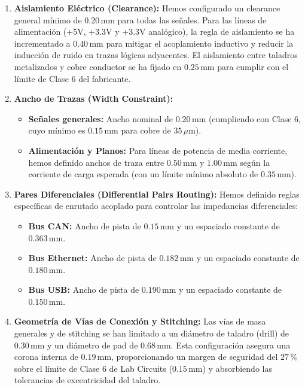 \documentclass[12pt,a4paper]{article}
\begin{document}
\begin{enumerate}
    \item \textbf{Aislamiento Eléctrico (Clearance):} Hemos configurado un clearance general mínimo de $0.20\,\text{mm}$ para todas las señales. Para las líneas de alimentación (+5V, +3.3V y +3.3V analógico), la regla de aislamiento se ha incrementado a $0.40\,\text{mm}$ para mitigar el acoplamiento inductivo y reducir la inducción de ruido en trazas lógicas adyacentes. El aislamiento entre taladros metalizados y cobre conductor se ha fijado en $0.25\,\text{mm}$ para cumplir con el límite de Clase 6 del fabricante.
    \item \textbf{Ancho de Trazas (Width Constraint):}
    \begin{itemize}
        \item \textbf{Señales generales:} Ancho nominal de $0.20\,\text{mm}$ (cumpliendo con Clase 6, cuyo mínimo es $0.15\,\text{mm}$ para cobre de $35\,\mu\text{m}$).
        \item \textbf{Alimentación y Planos:} Para líneas de potencia de media corriente, hemos definido anchos de traza entre $0.50\,\text{mm}$ y $1.00\,\text{mm}$ según la corriente de carga esperada (con un límite mínimo absoluto de $0.35\,\text{mm}$).
    \end{itemize}
    \item \textbf{Pares Diferenciales (Differential Pairs Routing):} Hemos definido reglas específicas de enrutado acoplado para controlar las impedancias diferenciales:
    \begin{itemize}
        \item \textbf{Bus CAN:} Ancho de pista de $0.15\,\text{mm}$ y un espaciado constante de $0.363\,\text{mm}$.
        \item \textbf{Bus Ethernet:} Ancho de pista de $0.182\,\text{mm}$ y un espaciado constante de $0.180\,\text{mm}$.
        \item \textbf{Bus USB:} Ancho de pista de $0.190\,\text{mm}$ y un espaciado constante de $0.150\,\text{mm}$.
    \end{itemize}
    \item \textbf{Geometría de Vías de Conexión y Stitching:} Las vías de masa generales y de stitching se han limitado a un diámetro de taladro (drill) de $0.30\,\text{mm}$ y un diámetro de pad de $0.68\,\text{mm}$. Esta configuración asegura una corona interna de $0.19\,\text{mm}$, proporcionando un margen de seguridad del $27$\,\% sobre el límite de Clase 6 de Lab Circuits ($0.15\,\text{mm}$) y absorbiendo las tolerancias de excentricidad del taladro.
\end{enumerate}
\end{document}
